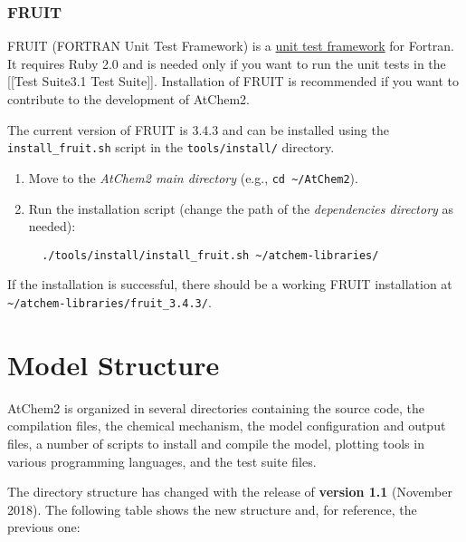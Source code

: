 \subsubsection{FRUIT} \label{fruit}

FRUIT (FORTRAN Unit Test Framework) is a
\href{https://en.wikipedia.org/wiki/Unit_testing}{unit test framework}
for Fortran. It requires Ruby 2.0 and is needed only if you want to
run the unit tests in the {[}{[}Test Suite\textbar{}3.1 Test
Suite{]}{]}.  Installation of FRUIT is recommended if you want to
contribute to the development of AtChem2.

The current version of FRUIT is 3.4.3 and can be installed using the
\texttt{install\_fruit.sh} script in the \texttt{tools/install/}
directory.

\begin{enumerate}
\item Move to the \emph{AtChem2 main directory} (e.g., \texttt{cd\
    \textasciitilde{}/AtChem2}).
\item Run the installation script (change the path of the
  \emph{dependencies directory} as needed):
\begin{verbatim}
  ./tools/install/install_fruit.sh ~/atchem-libraries/
\end{verbatim}
\end{enumerate}

If the installation is successful, there should be a working FRUIT
installation at
\texttt{\textasciitilde{}/atchem-libraries/fruit\_3.4.3/}.

\section{Model Structure} \label{sec:structure}

AtChem2 is organized in several directories containing the source
code, the compilation files, the chemical mechanism, the model
configuration and output files, a number of scripts to install and
compile the model, plotting tools in various programming languages,
and the test suite files.

The directory structure has changed with the release of
\textbf{version 1.1} (November 2018). The following table shows the
new structure and, for reference, the previous one:

